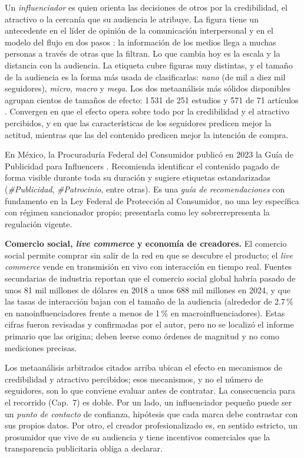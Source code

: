 Un \emph{influenciador} es quien orienta las decisiones de otros por la
credibilidad, el atractivo o la cercanía que su audiencia le atribuye. La
figura tiene un antecedente en el líder de opinión de la comunicación
interpersonal y en el modelo del flujo en dos pasos
\parencite{lazarsfeld1944peopleschoice,katzlazarsfeld1955}: la
información de los medios llega a muchas personas a través de otras que la
filtran. Lo que cambia hoy es la escala y la distancia con la audiencia. La
etiqueta cubre figuras muy distintas, y el tamaño de la audiencia es la
forma más usada de clasificarlas: \emph{nano} (de mil a diez mil
seguidores), \emph{micro}, \emph{macro} y \emph{mega}. Los dos metaanálisis
más sólidos disponibles agrupan cientos de tamaños de efecto: 1\,531 de 251
estudios \parencite{leung2022influencer} y 571 de 71 artículos
\parencite{barari2025influencer}. Convergen en que el efecto opera
sobre todo por la credibilidad y el atractivo percibidos, y en que las
características de los seguidores predicen mejor la actitud, mientras que las del
contenido predicen mejor la intención de compra.

En México, la Procuraduría Federal del Consumidor publicó en 2023 la Guía de
Publicidad para Influencers \parencite{profeco2023influencers}. Recomienda
identificar el contenido pagado de forma visible durante toda su duración y
sugiere etiquetas estandarizadas (\textit{\#Publicidad}, \textit{\#Patrocinio},
entre otras). Es una \emph{guía de recomendaciones} con fundamento en la Ley
Federal de Protección al Consumidor, no una ley específica con régimen
sancionador propio; presentarla como ley sobrerrepresenta la regulación
vigente.

\begin{cajaFrontera}
\textbf{Comercio social, \textit{live commerce} y economía de creadores.} El
comercio social permite comprar sin salir de la red en que se descubre el
producto; el \textit{live commerce} vende en transmisión en vivo con
interacción en tiempo real. Fuentes secundarias de industria reportan que el
comercio social global habría pasado de unos 81 mil millones de dólares
en 2018 a unos 688 mil millones en 2024, y que las tasas de interacción
bajan con el tamaño de la audiencia (alrededor de 2.7\,\% en
nanoinfluenciadores frente a menos de 1\,\% en macroinfluenciadores). Estas
cifras fueron revisadas y confirmadas por el autor, pero no se localizó el
informe primario que las origina; deben leerse como órdenes de magnitud y no
como mediciones precisas.

Los metaanálisis arbitrados citados arriba ubican el efecto en mecanismos
de credibilidad y atractivo percibidos; esos mecanismos, y no el número de
seguidores, son lo que conviene evaluar antes de contratar. La consecuencia
para el recorrido (Cap.~7) es doble. Por un lado, un influenciador
pequeño puede ser un \emph{punto de contacto} de confianza, hipótesis que
cada marca debe contrastar con sus propios datos. Por otro, el creador
profesionalizado es, en sentido estricto, un
prosumidor que vive de su audiencia y tiene incentivos comerciales que la
transparencia publicitaria obliga a declarar.
\end{cajaFrontera}

